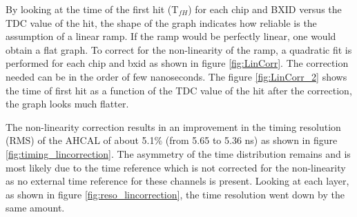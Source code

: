 By looking at the time of the first hit (T$_{fH}$) for each chip and BXID versus the TDC value of the hit, the shape of the graph indicates how reliable is the assumption of a linear ramp. If the ramp would be perfectly linear, one would obtain a flat graph. To correct for the non-linearity of the ramp, a quadratic fit is performed for each chip and \acrshort{bxid} as shown in figure \ref{fig:LinCorr}. The correction needed can be in the order of few nanoseconds. The figure \ref{fig:LinCorr_2} shows the time of first hit as a function of the TDC value of the hit after the correction, the graph looks much flatter.

The non-linearity correction results in an improvement in the timing resolution (RMS) of the AHCAL of about 5.1\% (from 5.65 to 5.36 ns) as shown in figure \ref{fig:timing_lincorrection}. The asymmetry of the time distribution remains and is most likely due to the time reference which is not corrected for the non-linearity as no external time reference for these channels is present. Looking at each layer, as shown in figure \ref{fig:reso_lincorrection}, the time resolution went down by the same amount.

